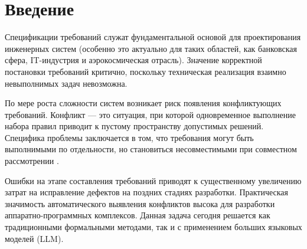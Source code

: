 \begin{abstract}
Инженерия требований критически зависит от своевременного выявления логических противоречий. В исследовании рассматривается проблема оценки способности больших языковых моделей выявлять логические конфликты в требованиях. Существующие общие наборы данных для логического вывода не ориентированы на контролируемое исследование многокомпонентных конфликтов требований. В данной статье предлагается методология тестирования, генерирующая текстовые наборы данных с контролируемым уровнем информационного шума и заданной кардинальностью минимального невыполнимого подмножества требований (количеством требований, образующих противоречие). Для математической верификации конфликтов применяется SMT-решатель Z3. Введен метод структурного доказательства уникальности конфликта, позволяющий верифицировать наборы данных за линейное время. Архитектура разработанной программы включает строго изолированную среду для нейросимвольного исполнения кода. Результаты эксперимента на базе моделей Qwen2.5, Gemma-4 и GPT-OSS статистически подтверждают превосходство нейросимвольного контура над прямым LLM-подходом в точности локализации ядра противоречия, однако выявляют его критическую уязвимость к сбоям кодогенерации у протестированных моделей. Исходный код и наборы данных доступны по адресу: \url{https://github.com/Volodya1000/LogicMUS-Eval}.
\end{abstract}

\section{Введение}
Спецификации требований служат фундаментальной основой для проектирования инженерных систем (особенно это актуально для таких областей, как банковская сфера, IT-индустрия и аэрокосмическая отрасль). Значение корректной постановки требований критично, поскольку техническая реализация взаимно невыполнимых задач невозможна.

По мере роста сложности систем возникает риск появления конфликтующих требований. Конфликт — это ситуация, при которой одновременное выполнение набора правил приводит к пустому пространству допустимых решений. Специфика проблемы заключается в том, что требования могут быть выполнимыми по отдельности, но становиться несовместимыми при совместном рассмотрении \cite{lamsweerde1998}.

Ошибки на этапе составления требований приводят к существенному увеличению затрат на исправление дефектов на поздних стадиях разработки. Практическая значимость автоматического выявления конфликтов высока для разработки аппаратно-программных комплексов. Данная задача сегодня решается как традиционными формальными методами, так и с применением больших языковых моделей (LLM).

